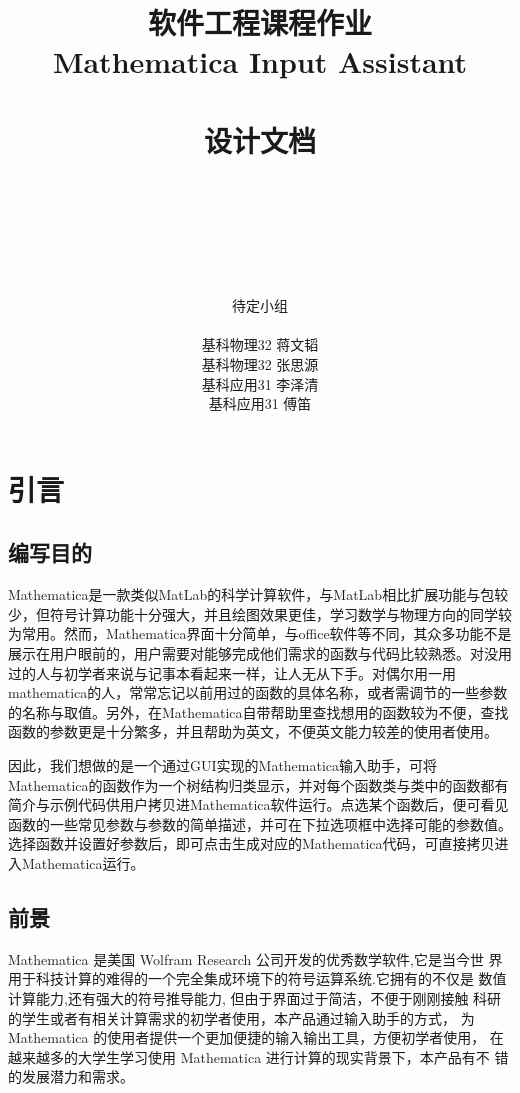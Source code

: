 \documentclass[hyperref, UTF8
,bookmarksnumbered=true, oneside]{ctexbook}
\title{\huge{软件工程课程作业}\\ \Huge \textbf{Mathematica Input Assistant} \\\phantom{aaa} \\\Huge{设计文档}}
\author{\\ \phantom{aaa} \\\phantom{aaa} \\ \phantom{aaa}\\\\\\\huge{待定小组}\\\\ \Large{基科物理32{  }蒋文韬}\\ \Large{基科物理32{ }张思源{ }}\\ \Large{基科应用31{ }李泽清{ }} \\ \Large{基科应用31 { }傅笛{ }} }
\begin{document}
\Large

\frontmatter
\maketitle 

\tableofcontents

\mainmatter

\chapter{引言}

	\section{编写目的} %

		Mathematica是一款类似MatLab的科学计算软件，与MatLab相比扩展功能与包较少，但符号计算功能十分强大，并且绘图效果更佳，学习数学与物理方向的同学较为常用。然而，Mathematica界面十分简单，与office软件等不同，其众多功能不是展示在用户眼前的，用户需要对能够完成他们需求的函数与代码比较熟悉。对没用过的人与初学者来说与记事本看起来一样，让人无从下手。对偶尔用一用mathematica的人，常常忘记以前用过的函数的具体名称，或者需调节的一些参数的名称与取值。另外，在Mathematica自带帮助里查找想用的函数较为不便，查找函数的参数更是十分繁多，并且帮助为英文，不便英文能力较差的使用者使用。

		因此，我们想做的是一个通过GUI实现的Mathematica输入助手，可将Mathematica的函数作为一个树结构归类显示，并对每个函数类与类中的函数都有简介与示例代码供用户拷贝进Mathematica软件运行。点选某个函数后，便可看见函数的一些常见参数与参数的简单描述，并可在下拉选项框中选择可能的参数值。选择函数并设置好参数后，即可点击生成对应的Mathematica代码，可直接拷贝进入Mathematica运行。
		

	\section{前景} %

		Mathematica 是美国 Wolfram Research 公司开发的优秀数学软件,它是当今世
界用于科技计算的难得的一个完全集成环境下的符号运算系统.它拥有的不仅是
数值计算能力,还有强大的符号推导能力, 但由于界面过于简洁，不便于刚刚接触
科研的学生或者有相关计算需求的初学者使用，本产品通过输入助手的方式，
为 Mathematica 的使用者提供一个更加便捷的输入输出工具，方便初学者使用，
在越来越多的大学生学习使用 Mathematica 进行计算的现实背景下，本产品有不
错的发展潜力和需求。
		
\end{document}
